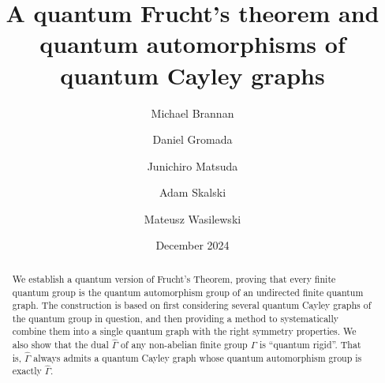 \documentclass[12pt]{amsart}
\theoremstyle{definition}
\theoremstyle{definition}
\theoremstyle{definition}
\theoremstyle{definition}
\numberwithin{equation}{section}
\begin{document}
\title[Quantum Frucht's Theorem]{A quantum Frucht's theorem and quantum automorphisms of quantum Cayley graphs}
\author[Brannan]{Michael Brannan}
\address{Department of Pure Mathematics, Faculty of Mathematics, University of Waterloo. 200 University Ave W, Waterloo, ON N2L 3G1, Canada}

\author[Gromada]{Daniel Gromada}
\address{Czech Technical University in Prague, Faculty of Electrical Engineering, Department of Mathematics, Technická 2, 166 27 Praha 6, Czechia}

\author[Matsuda]{Junichiro Matsuda}
\address{Department of Pure Mathematics, Faculty of Mathematics, University of Waterloo. 200 University Ave W, Waterloo, ON N2L 3G1, Canada}

\author[Skalski]{Adam Skalski}
\address{Institute of Mathematics of the Polish Academy of Sciences, ul. \'Sniadeckich 8, 00-656 Warszawa, Poland}

\author[Wasilewski]{Mateusz Wasilewski}
\address{Institute of Mathematics of the Polish Academy of Sciences, ul. \'Sniadeckich 8, 00-656 Warszawa, Poland}
\date{December 2024}




\begin{abstract}
We establish a quantum version of Frucht's Theorem, proving that every finite quantum group is the quantum automorphism group of an undirected finite quantum graph. The construction is based on first considering several quantum Cayley graphs of the quantum group in question, and then providing a method to systematically combine them into a single quantum graph with the right symmetry properties. We also show that the dual $\widehat \Gamma$ of any non-abelian finite group $\Gamma$ is ``quantum rigid''. 
 That is,  $\widehat \Gamma$ always admits a quantum Cayley graph whose quantum automorphism group is exactly $\widehat \Gamma$. 
\end{abstract}

\end{document}
